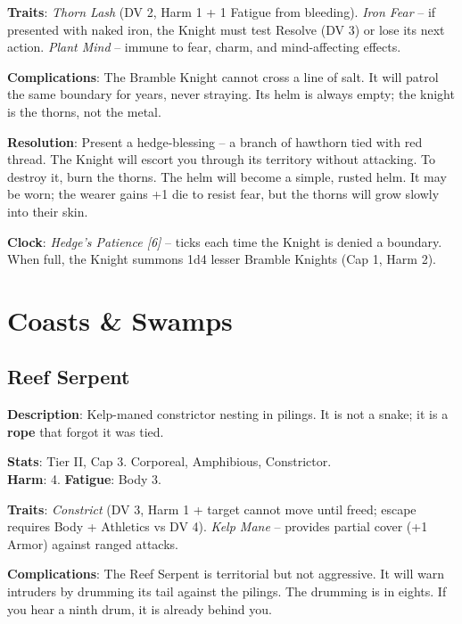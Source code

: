 \noindent\textbf{Traits}: 
\emph{Thorn Lash} (DV 2, Harm 1 + 1 Fatigue from bleeding). \emph{Iron Fear} -- if presented with naked iron, the Knight must test Resolve (DV 3) or lose its next action. \emph{Plant Mind} -- immune to fear, charm, and mind-affecting effects.

\noindent\textbf{Complications}: The Bramble Knight cannot cross a line of salt. It will patrol the same boundary for years, never straying. Its helm is always empty; the knight is the thorns, not the metal.

\noindent\textbf{Resolution}: Present a hedge-blessing -- a branch of hawthorn tied with red thread. The Knight will escort you through its territory without attacking. To destroy it, burn the thorns. The helm will become a simple, rusted helm. It may be worn; the wearer gains +1 die to resist fear, but the thorns will grow slowly into their skin.

\noindent\textbf{Clock}: \emph{Hedge's Patience [6]} -- ticks each time the Knight is denied a boundary. When full, the Knight summons 1d4 lesser Bramble Knights (Cap 1, Harm 2).


\section*{Coasts & Swamps}

\subsection*{Reef Serpent}

\noindent\textbf{Description}: Kelp-maned constrictor nesting in pilings. It is not a snake; it is a \textbf{rope} that forgot it was tied.

\noindent\textbf{Stats}: Tier II, Cap 3. Corporeal, Amphibious, Constrictor.\\
\textbf{Harm}: 4. \textbf{Fatigue}: Body 3.

\noindent\textbf{Traits}: 
\emph{Constrict} (DV 3, Harm 1 + target cannot move until freed; escape requires Body + Athletics vs DV 4). \emph{Kelp Mane} -- provides partial cover (+1 Armor) against ranged attacks.

\noindent\textbf{Complications}: The Reef Serpent is territorial but not aggressive. It will warn intruders by drumming its tail against the pilings. The drumming is in eights. If you hear a ninth drum, it is already behind you.

